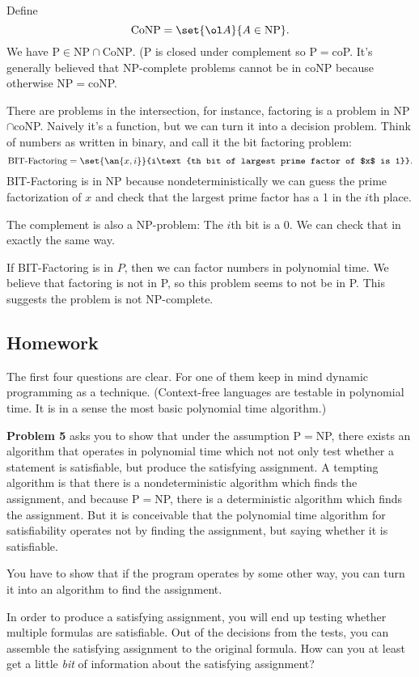 Define 
\[
\text{CoNP}=\set{\ol A}{A\in \text{NP}}.
\]
We have P$\in \text{NP}\cap \text{CoNP}$. (P is closed under complement so P$=$coP. It's generally believed that NP-complete problems cannot be in coNP because otherwise NP$=$coNP. 


There are problems in the intersection, for instance, factoring is a problem in NP$\cap $coNP. Naively it's a function, but we can turn it into a decision problem. Think of numbers as written in binary, and call it the bit factoring problem: %
\[
\text{BIT-Factoring}=\set{\an{x,i}}{i\text{th bit of largest prime factor of $x$ is 1}}.
\]
BIT-Factoring is in NP because nondeterministically we can guess the prime factorization of $x$ and check that the largest prime factor has a 1 in the $i$th place. %

The complement is also a NP-problem: The $i$th bit is a 0. We can check that in exactly the same way.

If BIT-Factoring is in $P$, then we can factor numbers in polynomial time. We believe that factoring is not in P, so this problem seems to not be in P. This suggests the problem is not NP-complete.
\subsection*{Homework}
The first four questions are clear. For one of them keep in mind dynamic programming as a technique. (Context-free languages are testable in polynomial time. It is in a sense the most basic polynomial time algorithm.)

\textbf{Problem 5} asks you to show that under the assumption P$=$NP, there exists an algorithm that operates in polynomial time which not not only test whether a statement is satisfiable, but produce the satisfying assignment. A tempting algorithm is that there is a nondeterministic algorithm which finds the assignment, and because P$=$NP, there is a deterministic algorithm which finds the assignment.
But it is conceivable that the polynomial time algorithm for satisfiability operates not by finding the assignment, but saying whether it is satisfiable.

You have to show that if the program operates by some other way, you can turn it into an algorithm to find the assignment.

In order to produce a satisfying assignment, you will end up testing whether multiple formulas are satisfiable.%
Out of the decisions from the tests, you can assemble the satisfying assignment to the original formula. How can you at least get a little {\it bit} of information about the satisfying assignment?

